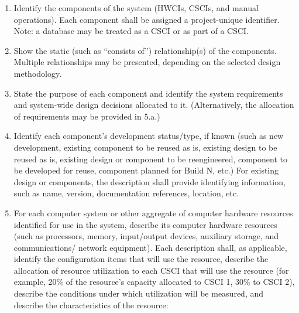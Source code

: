 \documentclass{fidata-report-template}
\begin{document}
\begin{enumerate}
\itemsep1pt\parskip0pt
\item
  Identify the components of the system (HWCIs, CSCIs, and manual
  operations). Each component shall be assigned a project-unique
  identifier. Note: a database may be treated as a CSCI or as part of a
  CSCI.
\item
  Show the static (such as ``consists of'') relationship(s) of the
  components. Multiple relationships may be presented, depending on the
  selected design methodology.
\item
  State the purpose of each component and identify the system
  requirements and system-wide design decisions allocated to it.
  (Alternatively, the allocation of requirements may be provided in
  5.a.)
\item
  Identify each component's development status/type, if known (such as
  new development, existing component to be reused as is, existing
  design to be reused as is, existing design or component to be
  reengineered, component to be developed for reuse, component planned
  for Build N, etc.) For existing design or components, the description
  shall provide identifying information, such as name, version,
  documentation references, location, etc.
\item
  For each computer system or other aggregate of computer hardware
  resources identified for use in the system, describe its computer
  hardware resources (such as processors, memory, input/output devices,
  auxiliary storage, and communications/ network equipment). Each
  description shall, as applicable, identify the configuration items
  that will use the resource, describe the allocation of resource
  utilization to each CSCI that will use the resource (for example, 20\%
  of the resource's capacity allocated to CSCI 1, 30\% to CSCI 2),
  describe the conditions under which utilization will be measured, and
  describe the characteristics of the resource:


\end{enumerate}
\end{document}
